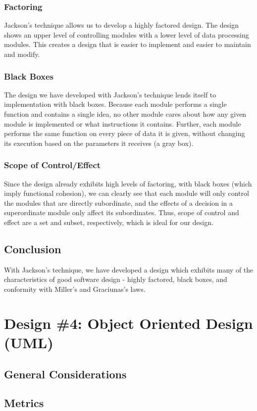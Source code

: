 \documentclass{article}
\begin{document}
		\subsubsection{Factoring} 
			Jackson's technique allows us to develop a highly factored design. The design shows an upper level of controlling modules with a lower level of data processing modules. This creates a design that is easier to implement and easier to maintain and modify. 
		\subsubsection{Black Boxes}
			The design we have developed with Jackson's technique lends itself to implementation with black boxes. Because each module performs a single function and contains a single idea, no other module cares about how any given module is implemented or what instructions it contains. Further, each module performs the same function on every piece of data it is given, without changing its execution based on the parameters it receives (a gray box). 
		\subsubsection{Scope of Control/Effect}
			Since the design already exhibits high levels of factoring, with black boxes (which imply functional cohesion), we can clearly see that each module will only control the modules that are directly subordinate, and the effects of a decision in a superordinate module only affect its subordinates. Thus, scope of control and effect are a set and subset, respectively, which is ideal for our design. 
	\subsection{Conclusion}
		With Jackson's technique, we have developed a design which exhibits many of the characteristics of good software design - highly factored, black boxes, and conformity with Miller's and Graciunas's laws.  
%
%
\section{Design \#4: Object Oriented Design (UML)}
	\subsection{General Considerations}
	\subsection{Metrics}
\end{document}
